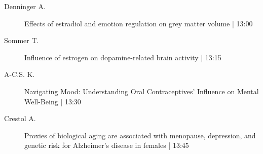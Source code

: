 \begin{symposium}
\begin{description}
                \item [ Denninger A.] Effects of estradiol and emotion regulation on grey matter volume  \textcolor{mygray}{ | 13:00}    
                
                \item [ Sommer T.] Influence of estrogen on dopamine-related brain activity \textcolor{mygray}{ | 13:15}    
                
                \item [ A-C.S. K.] Navigating Mood: Understanding Oral Contraceptives' Influence on Mental Well-Being  \textcolor{mygray}{ | 13:30}    
                
                \item [ Crestol A.] Proxies of biological aging are associated with menopause, depression, and genetic risk for Alzheimer’s disease in females \textcolor{mygray}{ | 13:45}    
                
            \end{description} 
            \end{symposium}
            